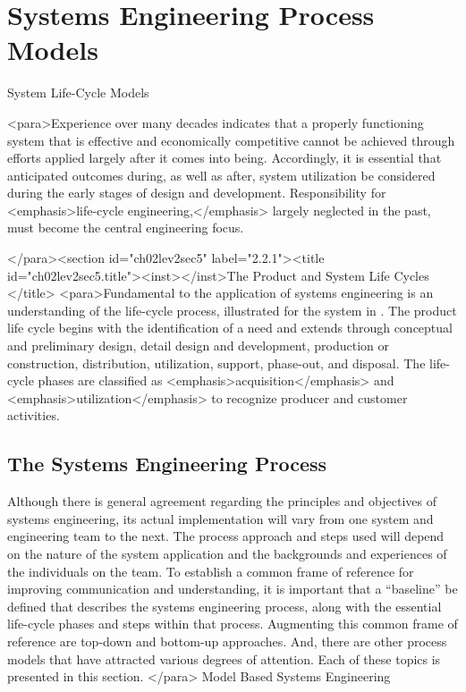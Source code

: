 \section{Systems Engineering Process Models}

System Life-Cycle Models

<para>Experience over many decades indicates that a properly functioning system that is effective and economically competitive cannot be achieved through efforts applied largely after it comes into being. Accordingly, it is essential that anticipated outcomes during, as well as after, system utilization be considered during the early stages of design and development. Responsibility for <emphasis>life-cycle engineering,</emphasis> largely neglected in the past, must become the central engineering focus.

</para><section id="ch02lev2sec5" label="2.2.1"><title id="ch02lev2sec5.title"><inst></inst>The Product and System Life Cycles
</title>
<para>Fundamental to the application of systems engineering is an understanding of the life-cycle process, illustrated for the system in . The product life cycle begins with the identification of a need and extends through conceptual and preliminary design, detail design and development, production or construction, distribution, utilization, support, phase-out, and disposal. The life-cycle phases are classified as <emphasis>acquisition</emphasis> and <emphasis>utilization</emphasis> to recognize producer and customer activities.

\subsection{The Systems Engineering Process}

Although there is general agreement regarding the principles and objectives of systems engineering, its actual implementation will vary from one system and engineering team to the next. The process approach and steps used will depend on the nature of the system application and the backgrounds and experiences of the individuals on the team. To establish a common frame of reference for improving communication and understanding, it is important that a “baseline” be defined that describes the systems engineering process, along with the essential life-cycle phases and steps within that process. Augmenting this common frame of reference are top-down and bottom-up approaches. And, there are other process models that have attracted various degrees of attention. Each of these topics is presented in this section.
</para>
Model Based Systems Engineering

